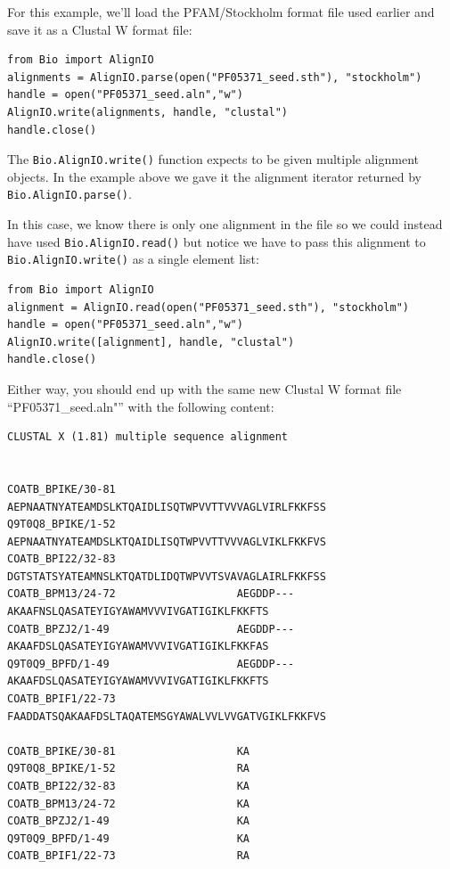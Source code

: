 \documentclass{report}
\begin{document}
For this example, we'll load the PFAM/Stockholm format file used earlier and save it as a Clustal W format file:

\begin{verbatim}
from Bio import AlignIO
alignments = AlignIO.parse(open("PF05371_seed.sth"), "stockholm")
handle = open("PF05371_seed.aln","w")
AlignIO.write(alignments, handle, "clustal")
handle.close()
\end{verbatim}

The \verb|Bio.AlignIO.write()| function expects to be given multiple alignment objects.  In the example above we gave it the alignment iterator returned by \verb|Bio.AlignIO.parse()|.

In this case, we know there is only one alignment in the file so we could instead have used \verb|Bio.AlignIO.read()| but notice we have to pass this alignment to \verb|Bio.AlignIO.write()| as a single element list:

\begin{verbatim}
from Bio import AlignIO
alignment = AlignIO.read(open("PF05371_seed.sth"), "stockholm")
handle = open("PF05371_seed.aln","w")
AlignIO.write([alignment], handle, "clustal")
handle.close()
\end{verbatim}

Either way, you should end up with the same new Clustal W format file ``PF05371\_seed.aln"'' with the following content:

\begin{verbatim}
CLUSTAL X (1.81) multiple sequence alignment


COATB_BPIKE/30-81                   AEPNAATNYATEAMDSLKTQAIDLISQTWPVVTTVVVAGLVIRLFKKFSS
Q9T0Q8_BPIKE/1-52                   AEPNAATNYATEAMDSLKTQAIDLISQTWPVVTTVVVAGLVIKLFKKFVS
COATB_BPI22/32-83                   DGTSTATSYATEAMNSLKTQATDLIDQTWPVVTSVAVAGLAIRLFKKFSS
COATB_BPM13/24-72                   AEGDDP---AKAAFNSLQASATEYIGYAWAMVVVIVGATIGIKLFKKFTS
COATB_BPZJ2/1-49                    AEGDDP---AKAAFDSLQASATEYIGYAWAMVVVIVGATIGIKLFKKFAS
Q9T0Q9_BPFD/1-49                    AEGDDP---AKAAFDSLQASATEYIGYAWAMVVVIVGATIGIKLFKKFTS
COATB_BPIF1/22-73                   FAADDATSQAKAAFDSLTAQATEMSGYAWALVVLVVGATVGIKLFKKFVS

COATB_BPIKE/30-81                   KA
Q9T0Q8_BPIKE/1-52                   RA
COATB_BPI22/32-83                   KA
COATB_BPM13/24-72                   KA
COATB_BPZJ2/1-49                    KA
Q9T0Q9_BPFD/1-49                    KA
COATB_BPIF1/22-73                   RA
\end{verbatim}
\end{document}
